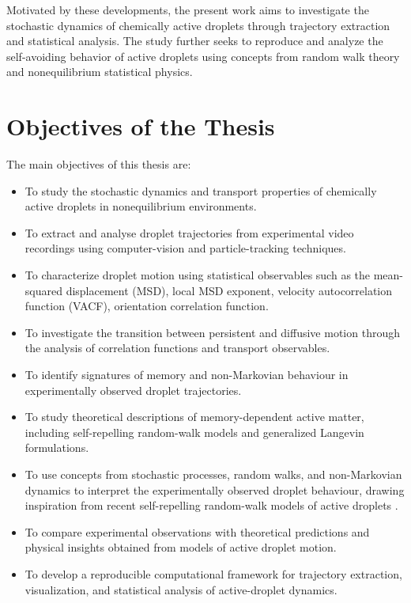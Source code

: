 Motivated by these developments, the present work aims to investigate the stochastic dynamics of chemically active droplets through trajectory extraction and statistical analysis. The study further seeks to reproduce and analyze the self-avoiding behavior of active droplets using concepts from random walk theory and nonequilibrium statistical physics.



\section{Objectives of the Thesis}

The main objectives of this thesis are:

\begin{itemize}

\item To study the stochastic dynamics and transport properties of chemically active droplets in nonequilibrium environments.

\item To extract and analyse droplet trajectories from experimental video recordings using computer-vision and particle-tracking techniques.

\item To characterize droplet motion using statistical observables such as the mean-squared displacement (MSD), local MSD exponent, velocity autocorrelation function (VACF), orientation correlation function.

\item To investigate the transition between persistent and diffusive motion through the analysis of correlation functions and transport observables.

\item To identify signatures of memory and non-Markovian behaviour in experimentally observed droplet trajectories.

\item To study theoretical descriptions of memory-dependent active matter, including self-repelling random-walk models and generalized Langevin formulations.

\item To use concepts from stochastic processes, random walks, and non-Markovian dynamics to interpret the experimentally observed droplet behaviour, drawing inspiration from recent self-repelling random-walk models of active droplets \cite{droplet2025}.

\item To compare experimental observations with theoretical predictions and physical insights obtained from models of active droplet motion.

\item To develop a reproducible computational framework for trajectory extraction, visualization, and statistical analysis of active-droplet dynamics.

\end{itemize}
